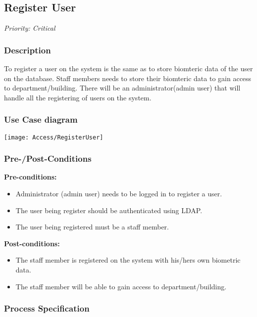 \subsection{Register User}
\textit{Priority: Critical} \\

\subsubsection{Description}
To register a user on the system is the same as to store biomteric data of the user on the database.
Staff members needs to store their biomteric data to gain access to department/building. There will be an administrator(admin user) that will handle all the registering of users on the system.

\subsubsection{Use Case diagram}
\texttt{[image: Access/RegisterUser]}

\subsubsection{Pre-/Post-Conditions}
\textbf{Pre-conditions:} 
	\begin{itemize}
		\item Administrator (admin user) needs to be logged in to register a user.
		\item The user being register should be authenticated using LDAP. 
		\item The user being registered must be a staff member.
	\end{itemize}
\textbf{ Post-conditions:} 
	\begin{itemize}
		\item The staff member is registered on the system with his/hers own biometric data.
		\item The staff member will be able to gain access to department/building.
	\end{itemize}
	
\subsubsection{Process Specification}
